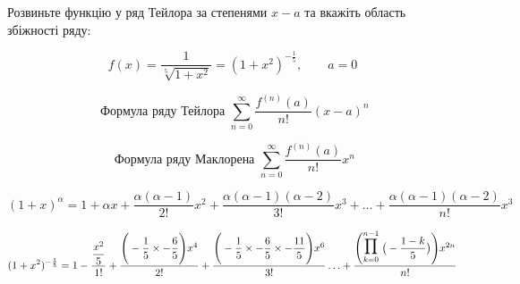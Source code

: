 Розвиньте функцію у ряд Тейлора за степенями $x-a$ та вкажіть область збіжності ряду:

$$
  f(x) = {\dfrac{1}{\sqrt[5]{1+x^2}}} = (1+x^2)^{-\frac{1}{5}}, \qquad a=0
$$

$$
{\text{ Формула ряду Тейлора }}\sum_{n=0}^\infty \dfrac{f^{(n)}(a)}{n!}(x-a)^n
$$


$$
{\text{ Формула ряду Маклорена }}\sum_{n=0}^\infty \dfrac{f^{(n)}(a)}{n!}x^n
$$


$$
(1+x)^{\alpha} = 1+\alpha x + \dfrac{\alpha(\alpha-1)}{2!}x^2 + \dfrac{\alpha(\alpha-1)(\alpha-2)}{3!}x^3 +\ldots + \dfrac{\alpha(\alpha-1)(\alpha-2)}{n!}x^3
$$


$$
(1+x^2)^{-\frac{1}{5}} = 1
  - \dfrac{ \dfrac{x^2}{5} }{ 1!}
  + \dfrac{ \Bigg( -\dfrac{1}{5} \times -\dfrac{6}{5} \Bigg) x^4}{2!}
  + \dfrac{ \Bigg( -\dfrac{1}{5} \times -\dfrac{6}{5} \times -\dfrac{11}{5} \Bigg) x^6} {3!}
  \ldots
  + \dfrac{ \Bigg( \Prod{k=0}{n-1} \big(-\dfrac{1-k}{5}\big) \Bigg) x^{2n} }{n!}
$$


%
%
%

